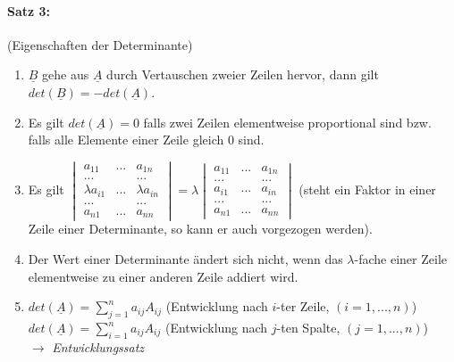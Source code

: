 \paragraph{Satz 3:} (Eigenschaften der Determinante)
\begin{enumerate}[label=(E\arabic*)]
\item $\underline{B}$ gehe aus $\underline{A}$ durch Vertauschen zweier Zeilen hervor, dann gilt $det(\underline{B})=-det(\underline{A})$.
\item Es gilt $det(\underline{A})=0$ falls zwei Zeilen elementweise proportional sind bzw. falls alle Elemente einer Zeile gleich $0$ sind. 
\item Es gilt $\begin{vmatrix}
a_{11} & ... & a_{1n}\\
... &  & ...\\
\lambda a_{i1} & ... & \lambda a_{in}\\
... & & ...\\
a_{n1} & ... & a_{nn}
\end{vmatrix}=\lambda\begin{vmatrix}
a_{11} & ... & a_{1n}\\
... &  & ...\\
a_{i1} & ... & a_{in}\\
... & & ...\\
a_{n1} & ... & a_{nn}
\end{vmatrix}$ (steht ein Faktor in einer Zeile einer Determinante, so kann er auch vorgezogen werden).
\item Der Wert einer Determinante ändert sich nicht, wenn das $\lambda$-fache einer Zeile elementweise zu einer anderen Zeile addiert wird.
\item $det(\underline{A})=\sum_{j=1}^{n}a_{ij}A_{ij}$ (Entwicklung nach $i$-ter Zeile, $(i=1,...,n)$)\\
$det(\underline{A})=\sum_{i=1}^{n}a_{ij}A_{ij}$ (Entwicklung nach $j$-ten Spalte, $(j=1,...,n)$)\\
$\rightarrow$ \emph{Entwicklungssatz}
\end{enumerate}

